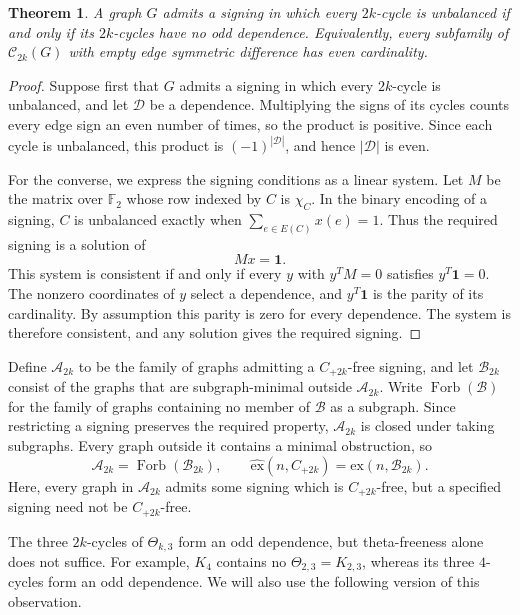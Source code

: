\documentclass{article}
\newcommand{\ex}{\mathrm{ex}}
\newcommand{\hex}{\widehat{\ex}}
\newcommand{\Forb}{\operatorname{Forb}}
\newcommand{\FF}{\mathbb{F}}
\newtheorem{theorem}{Theorem}[section]
\theoremstyle{definition}
\theoremstyle{remark}
\begin{document}
\begin{theorem}\label{thm:parity-criterion}
A graph $G$ admits a signing in which every $2k$-cycle is unbalanced if
and only if its $2k$-cycles have no odd dependence.  Equivalently, every
subfamily of $\mathcal C_{2k}(G)$ with empty edge symmetric difference
has even cardinality.
\end{theorem}
\begin{proof}
Suppose first that  $G$ admits a signing in which every $2k$-cycle is unbalanced, and let $\mathcal D$ be a
dependence.  Multiplying the signs of its cycles counts every edge sign
an even number of times, so the product is positive.  Since each cycle
is unbalanced, this product is $(-1)^{|\mathcal D|}$, and hence
$|\mathcal D|$ is even.

For the converse, we express the signing conditions as a linear system.
Let $M$ be the matrix over $\FF_2$ whose row indexed by $C$ is $\chi_C$.
In the binary encoding of a signing, $C$ is unbalanced exactly when
$\sum_{e\in E(C)}x(e)=1$.  Thus the required signing is a solution of
\[
Mx=\mathbf1.
\]
This system is consistent if and only if every $y$ with $y^TM=0$ satisfies
$y^T\mathbf1=0$.  The nonzero coordinates of $y$ select a dependence,
and $y^T\mathbf1$ is the parity of its cardinality.  By assumption this
parity is zero for every dependence.  The system is therefore consistent,
and any solution gives the required signing.
\end{proof}

Define $\mathcal A_{2k}$ to be the family of graphs admitting a
$C_{+2k}$-free signing, and let $\mathcal B_{2k}$ consist of the graphs
that are subgraph-minimal outside $\mathcal A_{2k}$.  Write
$\Forb(\mathcal B)$ for the family of graphs containing no member of $\mathcal B$ as a subgraph.  Since restricting a signing preserves the required
property, $\mathcal A_{2k}$ is closed under taking subgraphs.  Every graph
outside it contains a minimal obstruction, so
\begin{equation}\label{eq:support-turan-reformulation}
\mathcal A_{2k}=\Forb(\mathcal B_{2k}),
\qquad
\hex(n,C_{+2k})=\ex(n,\mathcal B_{2k}).
\end{equation}
Here, every graph in $\mathcal A_{2k}$ admits some signing which is $C_{+2k}$-free, but a
specified signing need not be $C_{+2k}$-free.

The three $2k$-cycles of $\Theta_{k,3}$ form an odd dependence, but
theta-freeness alone does not suffice.  For example, $K_4$ contains no
$\Theta_{2,3}=K_{2,3}$, whereas its three $4$-cycles form an odd
dependence.  We will also use the following version of this observation.
\end{document}
